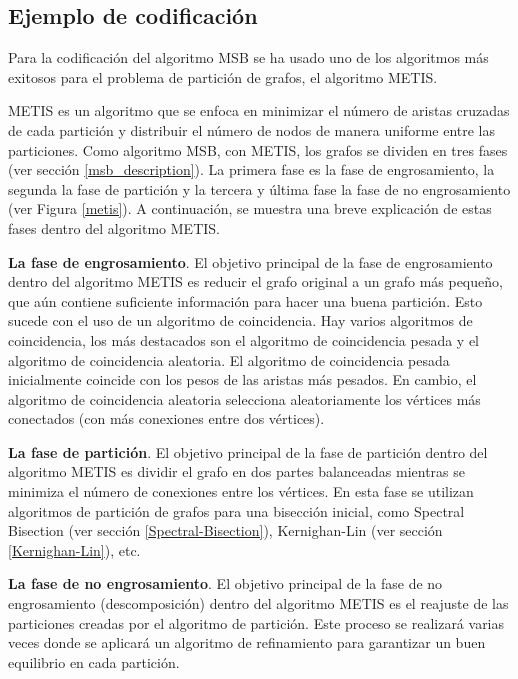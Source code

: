 \subsection{Ejemplo de codificación}

Para la codificación del algoritmo MSB se ha usado uno de los algoritmos más exitosos para el problema de partición de grafos, el algoritmo METIS.

METIS\cite{MeTis} es un algoritmo que se enfoca en minimizar el número de aristas cruzadas de cada partición y distribuir el número de nodos de manera uniforme entre las particiones. Como algoritmo MSB, con METIS, los grafos se dividen en tres fases (ver sección \ref{msb_description}). La primera fase es la fase de engrosamiento, la segunda la fase de partición y la tercera y última fase la fase de no engrosamiento (ver Figura \ref{metis}). A continuación, se muestra una breve explicación de estas fases dentro del algoritmo METIS.

\textbf{La fase de engrosamiento}. El objetivo principal de la fase de engrosamiento dentro del algoritmo METIS es reducir el grafo original a un grafo más pequeño, que aún contiene suficiente información para hacer una buena partición. Esto sucede con el uso de un algoritmo de coincidencia. Hay varios algoritmos de coincidencia, los más destacados son el algoritmo de coincidencia pesada y el algoritmo de coincidencia aleatoria. El algoritmo de coincidencia pesada inicialmente coincide con los pesos de las aristas más pesados. En cambio, el algoritmo de coincidencia aleatoria selecciona aleatoriamente los vértices más conectados (con más conexiones entre dos vértices). 

\textbf{La fase de partición}. El objetivo principal de la fase de partición dentro del algoritmo METIS es dividir el grafo en dos partes balanceadas mientras se minimiza el número de conexiones entre los vértices. En esta fase se utilizan algoritmos de partición de grafos para una bisección inicial, como Spectral Bisection (ver sección \ref{Spectral-Bisection}), Kernighan-Lin (ver sección \ref{Kernighan-Lin}), etc.  

\textbf{La fase de no engrosamiento}. El objetivo principal de la fase de no engrosamiento (descomposición) dentro del algoritmo METIS es el reajuste de las particiones creadas por el algoritmo de partición. Este proceso se realizará varias veces donde se aplicará un algoritmo de refinamiento para garantizar un buen equilibrio en cada partición.

